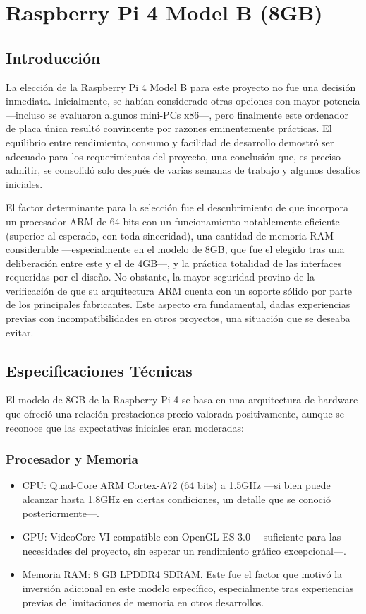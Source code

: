 \chapter{Raspberry Pi 4 Model B (8GB)}

\section{Introducción}
    La elección de la Raspberry Pi 4 Model B \cite{raspberrypi4} para este proyecto no fue una decisión inmediata. Inicialmente, se habían considerado otras opciones con mayor potencia —incluso se evaluaron algunos mini-PCs x86—, pero finalmente este ordenador de placa única resultó convincente por razones eminentemente prácticas. El equilibrio entre rendimiento, consumo y facilidad de desarrollo demostró ser adecuado para los requerimientos del proyecto, una conclusión que, es preciso admitir, se consolidó solo después de varias semanas de trabajo y algunos desafíos iniciales.

    El factor determinante para la selección fue el descubrimiento de que incorpora un procesador ARM de 64 bits con un funcionamiento notablemente eficiente (superior al esperado, con toda sinceridad), una cantidad de memoria RAM considerable —especialmente en el modelo de 8GB, que fue el elegido tras una deliberación entre este y el de 4GB—, y la práctica totalidad de las interfaces requeridas por el diseño. No obstante, la mayor seguridad provino de la verificación de que su arquitectura ARM cuenta con un soporte sólido por parte de los principales fabricantes. Este aspecto era fundamental, dadas experiencias previas con incompatibilidades en otros proyectos, una situación que se deseaba evitar.

\section{Especificaciones Técnicas}
    El modelo de 8GB de la Raspberry Pi 4 se basa en una arquitectura de hardware que ofreció una relación prestaciones-precio valorada positivamente, aunque se reconoce que las expectativas iniciales eran moderadas:

    \subsection{Procesador y Memoria}
    \begin{itemize}
        \item CPU: Quad-Core ARM Cortex-A72 (64 bits) a 1.5GHz —si bien puede alcanzar hasta 1.8GHz en ciertas condiciones, un detalle que se conoció posteriormente—.
        \item GPU: VideoCore VI compatible con OpenGL ES 3.0 —suficiente para las necesidades del proyecto, sin esperar un rendimiento gráfico excepcional—.
        \item Memoria RAM: 8 GB LPDDR4 SDRAM. Este fue el factor que motivó la inversión adicional en este modelo específico, especialmente tras experiencias previas de limitaciones de memoria en otros desarrollos.
    \end{itemize}

